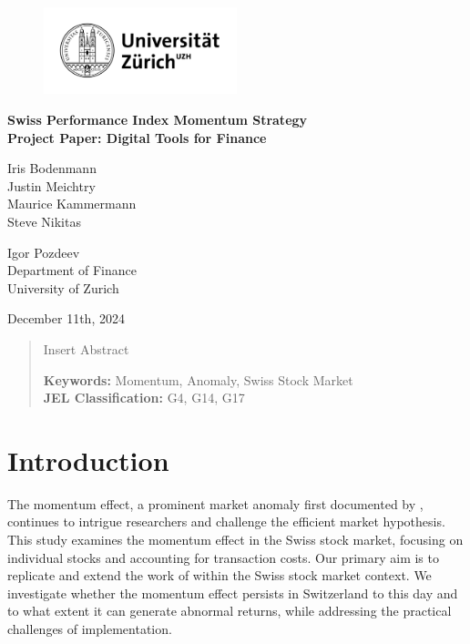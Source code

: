 \documentclass{article}
\begin{document}
	\begin{titlepage}
		\centering
		\begin{figure}[!h]
			\centering
			\includegraphics[width=0.5\textwidth]{Universität_Zürich_logo.png}
		\end{figure}
		\Large{\textbf{Swiss Performance Index Momentum Strategy \\ Project Paper: Digital Tools for Finance}\\}

		\vfill
		
		\large{Iris Bodenmann\\ Justin Meichtry\\ Maurice Kammermann \\ Steve Nikitas\\}
		
		\vfill
	
		\large{Igor Pozdeev\\Department of Finance\\ University of Zurich\\}

        \vfill
        \large{December 11th, 2024}
	
		\vfill
		\begin{abstract}
            Insert Abstract
			
			\vspace{2mm}
			
			\textbf{Keywords:} Momentum, Anomaly, Swiss Stock Market\\
            \textbf{JEL Classification:} G4, G14, G17
		\end{abstract}
		
		
	\end{titlepage}
    
\setcounter{page}{1}
\tableofcontents

\clearpage
\listoftables
\listoffigures
\clearpage


\setcounter{page}{1}
\section{Introduction}
The momentum effect, a prominent market anomaly first documented by \cite{jegatit1993}, continues to intrigue researchers and challenge the efficient market hypothesis. This study examines the momentum effect in the Swiss stock market, focusing on individual stocks and accounting for transaction costs. Our primary aim is to replicate and extend the work of \cite{jegatit1993} within the Swiss stock market context. We investigate whether the momentum effect persists in Switzerland to this day and to what extent it can generate abnormal returns, while addressing the practical challenges of implementation.\\
\end{document}
